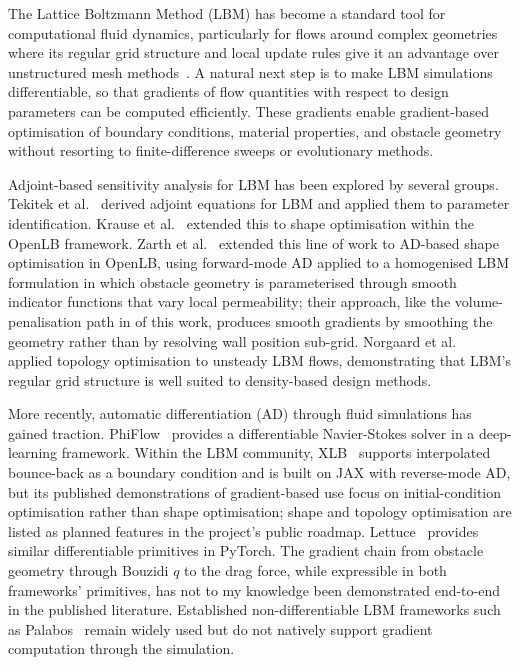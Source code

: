 \documentclass[10pt,twocolumn]{article}
\begin{document}
The Lattice Boltzmann Method (LBM) has become a standard tool for
computational fluid dynamics, particularly for flows around complex
geometries where its regular grid structure and local update rules give
it an advantage over unstructured mesh methods~\cite{kruger2017}. A
natural next step is to make LBM simulations differentiable, so that
gradients of flow quantities with respect to design parameters can be
computed efficiently. These gradients enable gradient-based optimisation
of boundary conditions, material properties, and obstacle geometry
without resorting to finite-difference sweeps or evolutionary methods.

Adjoint-based sensitivity analysis for LBM has been explored by several
groups. Tekitek et al.~\cite{tekitek2006} derived adjoint equations for
LBM and applied them to parameter identification. Krause et
al.~\cite{krause2013} extended this to shape optimisation within the
OpenLB framework. Zarth et al.~\cite{zarth2021} extended this line
of work to AD-based shape optimisation in OpenLB, using forward-mode
AD applied to a homogenised LBM formulation in which obstacle
geometry is parameterised through smooth indicator functions that
vary local permeability; their approach, like the volume-penalisation
path in  of this work, produces smooth gradients
by smoothing the geometry rather than by resolving wall position
sub-grid. Norgaard et al.~\cite{norgaard2016} applied topology
optimisation to unsteady LBM flows, demonstrating that LBM's regular
grid structure is well suited to density-based design methods.

More recently, automatic differentiation (AD) through fluid simulations
has gained traction. PhiFlow~\cite{holl2020} provides a differentiable
Navier-Stokes solver in a deep-learning framework. Within the LBM
community, XLB~\cite{ataei2024} supports interpolated bounce-back as
a boundary condition and is built on JAX with reverse-mode AD, but
its published demonstrations of gradient-based use focus on
initial-condition optimisation rather than shape optimisation; shape
and topology optimisation are listed as planned features in the
project's public roadmap. Lettuce~\cite{bedrunka2021} provides
similar differentiable primitives in PyTorch. The gradient chain
from obstacle geometry through Bouzidi $q$ to the drag force, while
expressible in both frameworks' primitives, has not to my knowledge
been demonstrated end-to-end in the published literature.
Established non-differentiable LBM frameworks such as
Palabos~\cite{latt2021} remain widely used but do not natively support
gradient computation through the simulation.
\end{document}
